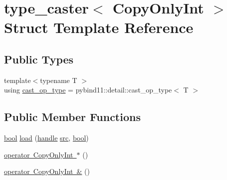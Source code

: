 \hypertarget{structtype__caster_3_01_copy_only_int_01_4}{}\section{type\+\_\+caster$<$ Copy\+Only\+Int $>$ Struct Template Reference}
\label{structtype__caster_3_01_copy_only_int_01_4}
\subsection*{Public Types}
\begin{DoxyCompactItemize}
\item 
{\footnotesize template$<$typename T $>$ }\\using \mbox{\hyperlink{structtype__caster_3_01_copy_only_int_01_4_a6d1c309a3d49f804c93051f1da9f87e6}{cast\+\_\+op\+\_\+type}} = pybind11\+::detail\+::cast\+\_\+op\+\_\+type$<$ T $>$
\end{DoxyCompactItemize}
\subsection*{Public Member Functions}
\begin{DoxyCompactItemize}
\item 
\mbox{\hyperlink{asdl_8h_af6a258d8f3ee5206d682d799316314b1}{bool}} \mbox{\hyperlink{structtype__caster_3_01_copy_only_int_01_4_aa0f7e3025d45fa3c88b30559ca1a8837}{load}} (\mbox{\hyperlink{classhandle}{handle}} \mbox{\hyperlink{_s_d_l__opengl__glext_8h_a72e0fdf0f845ded60b1fada9e9195cd7}{src}}, \mbox{\hyperlink{asdl_8h_af6a258d8f3ee5206d682d799316314b1}{bool}})
\item 
\mbox{\hyperlink{structtype__caster_3_01_copy_only_int_01_4_ae99ab4381f448d78dcc37060d4802ef9}{operator Copy\+Only\+Int $\ast$}} ()
\item 
\mbox{\hyperlink{structtype__caster_3_01_copy_only_int_01_4_a0ee2dcf9c8517356d31760f0e4359fde}{operator Copy\+Only\+Int \&}} ()
\end{DoxyCompactItemize}
